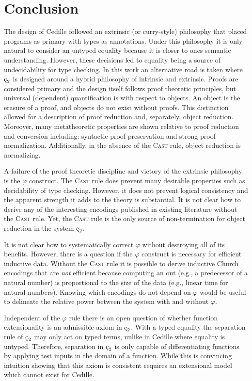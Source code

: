 \chapter{Conclusion}

The design of Cedille followed an extrinsic (or curry-style) philosophy that placed programs as primary with types as annotations.
Under this philosophy it is only natural to consider an untyped equality because it is closer to ones semantic understanding.
However, these decisions led to equality being a source of undecidability for type checking.
In this work an alternative road is taken where $\ced$ is designed around a hybrid philosophy of intrinsic and extrinsic.
Proofs are considered primary and the design itself follows proof theoretic principles, but universal (dependent) quantification is with respect to objects.
An object is the erasure of a proof, and objects do not exist without proofs.
This distinction allowed for a description of proof reduction and, separately, object reduction.
Moreover, many metatheoretic properties are shown relative to proof reduction and conversion including: syntactic proof preservation and strong proof normalization.
Additionally, in the absence of the \textsc{Cast} rule, object reduction is normalizing.

A failure of the proof theoretic discipline and victory of the extrinsic philosophy is the $\varphi$ construct.
The \textsc{Cast} rule does prevent many desirable properties such as decidability of type checking.
However, it does not prevent logical consistency and the apparent strength it adds to the theory is substantial.
It is not clear how to derive any of the interesting encodings published in existing literature without the \textsc{Cast} rule.
Yet, the \textsc{Cast} rule is the only source of non-termination for object reduction in the system $\ced$.

It is not clear how to systematically correct $\varphi$ without destroying all of its benefits.
However, there is a question if the $\varphi$ construct is necessary for efficient inductive data.
Without the \textsc{Cast} rule it is possible to derive inductive Church encodings that are \textit{not} efficient because computing an out (e.g., a predecessor of a natural number) is proportional to the size of the data (e.g., linear time for natural numbers).
Knowing which encodings do not depend on $\varphi$ would be useful to delineate the relative power between the system with and without $\varphi$.

Independent of the $\varphi$ rule there is an open question of whether function extensionality is an admissible axiom in $\ced$.
With a typed equality the separation rule of $\ced$ may only act on typed terms, unlike in Cedille where equality is untyped.
Therefore, separation in $\ced$ is only capable of differentiating functions by applying test inputs in the domain of a function.
While this is convincing intuition showing that this axiom is consistent requires an extensional model which cannot exist for Cedille.


